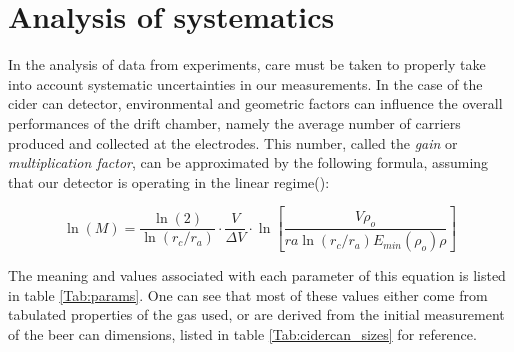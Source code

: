 \section{Analysis of systematics}
\label{sec:systematics}
In the analysis of data from experiments, care must be taken to properly take into account systematic uncertainties in our measurements. In the case of the cider can detector, environmental and geometric factors can influence the overall performances of the drift chamber, namely the average number of carriers produced and collected at the electrodes. This number, called the \textit{gain} or \textit{multiplication factor}, can be approximated by the following formula, assuming that our detector is operating in the linear regime(\cite{gas_detect}):

\begin{equation}
  \label{eq:lnm}
  \ln(M)=\frac{\ln(2)}{\ln(r_{c}/r_{a})}\cdot\frac{V}{\Delta V}\cdot\ln\left[ \frac{V\rho_{o}}{ra\ln(r_{c}/r_{a})E_{min}(\rho_{o})\rho}\right]
\end{equation}

The meaning and values associated with each parameter of this equation is listed in table \ref{Tab:params}. One can see that most of these values either come from tabulated properties of the gas used, or are derived from the initial measurement of the beer can dimensions, listed in table \ref{Tab:cidercan_sizes} for reference.

